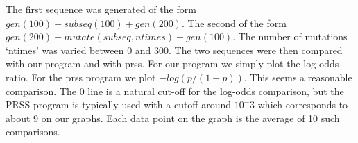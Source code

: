 \documentclass[a4paper,10pt,oneside]{article}
\begin{document}
The first sequence was generated of the form $gen(100) + subseq(100) +
gen(200)$.  The second of the form $gen(200) + mutate(subseq, ntimes) +
gen(100)$.  The number of mutations `ntimes' was varied between 0 and 300.
The two sequences were then compared with our program and with prss.  For our
program we simply plot the log-odds ratio.  For the prss program we plot
$-log(p/(1-p))$.  This seems a reasonable comparison.  The 0 line is a natural
cut-off for the log-odds comparison, but the PRSS program is typically used
with a cutoff around $10^-3$ which corresponds to about 9 on our graphs.
Each data point on the graph is the average of 10 such comparisons.

\begin{figure}[htb]
\centerline{}
\end{figure}

\begin{figure}[htb]
\centerline{}
\end{figure}

\begin{figure}[htb]
\centerline{}
\end{figure}
\end{document}

